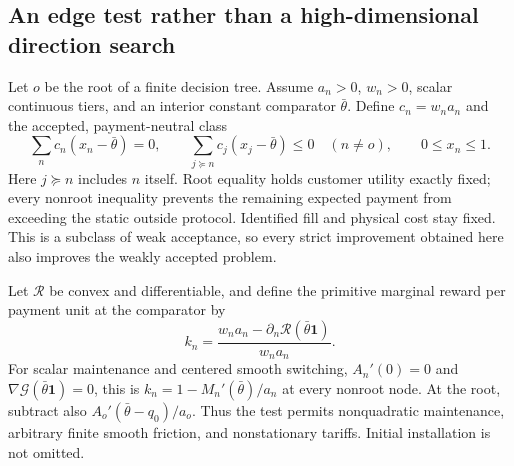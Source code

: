 \documentclass[11pt,letterpaper]{article}
\theoremstyle{definition}
\newcommand{\1}{\mathbf 1}
\begin{document}
\subsection{An edge test rather than a high-dimensional direction search}
Let $o$ be the root of a finite decision tree. Assume $a_n>0$, $w_n>0$, scalar continuous tiers, and an interior constant comparator $\bar\theta$. Define $c_n=w_na_n$ and the accepted, payment-neutral class
\begin{equation}\label{eq:r10-subtrees}
 \sum_n c_n(x_n-\bar\theta)=0,\qquad
 \sum_{j\succeq n}c_j(x_j-\bar\theta)\leq0\quad(n\ne o),\qquad 0\leq x_n\leq1.
\end{equation}
Here $j\succeq n$ includes $n$ itself. Root equality holds customer utility exactly fixed; every nonroot inequality prevents the remaining expected payment from exceeding the static outside protocol. Identified fill and physical cost stay fixed. This is a subclass of weak acceptance, so every strict improvement obtained here also improves the weakly accepted problem.

Let $\mathcal R$ be convex and differentiable, and define the primitive marginal reward per payment unit at the comparator by
\begin{equation}\label{eq:r10-k}
 k_n=\frac{w_na_n-\partial_n\mathcal R(\bar\theta\mathbf1)}{w_na_n}.
\end{equation}
For scalar maintenance and centered smooth switching, $A_n'(0)=0$ and $\nabla\mathcal G(\bar\theta\mathbf1)=0$, this is $k_n=1-M_n'(\bar\theta)/a_n$ at every nonroot node. At the root, subtract also $A_o'(\bar\theta-q_0)/a_o$. Thus the test permits nonquadratic maintenance, arbitrary finite smooth friction, and nonstationary tariffs. Initial installation is not omitted.
\end{document}

